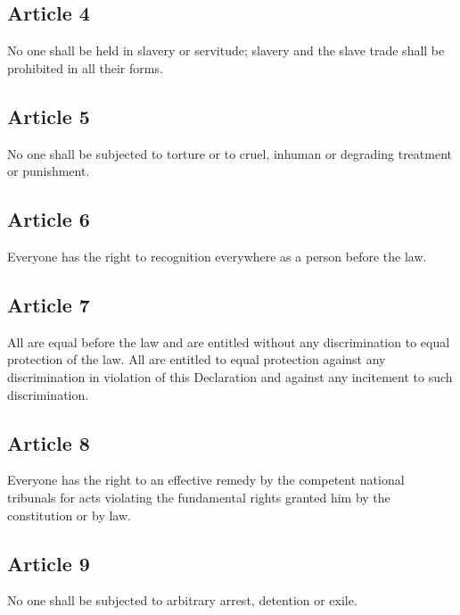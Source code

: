 \documentclass[
  titlepage,
  openright,
  DIV=calc,
  toc=listof,
  listof=nochaptergap]{scrbook}
\begin{document}
\hypertarget{article-4-1}{%
\subsection{Article 4}\label{article-4-1}}

No one shall be held in slavery or servitude; slavery and the slave
trade shall be prohibited in all their forms.

\hypertarget{article-5-1}{%
\subsection{Article 5}\label{article-5-1}}

No one shall be subjected to torture or to cruel, inhuman or degrading
treatment or punishment.

\hypertarget{article-6-1}{%
\subsection{Article 6}\label{article-6-1}}

Everyone has the right to recognition everywhere as a person before the
law.

\hypertarget{article-7-1}{%
\subsection{Article 7}\label{article-7-1}}

All are equal before the law and are entitled without any discrimination
to equal protection of the law. All are entitled to equal protection
against any discrimination in violation of this Declaration and against
any incitement to such discrimination.

\hypertarget{article-8-1}{%
\subsection{Article 8}\label{article-8-1}}

Everyone has the right to an effective remedy by the competent national
tribunals for acts violating the fundamental rights granted him by the
constitution or by law.

\hypertarget{article-9-1}{%
\subsection{Article 9}\label{article-9-1}}

No one shall be subjected to arbitrary arrest, detention or exile.
\end{document}
